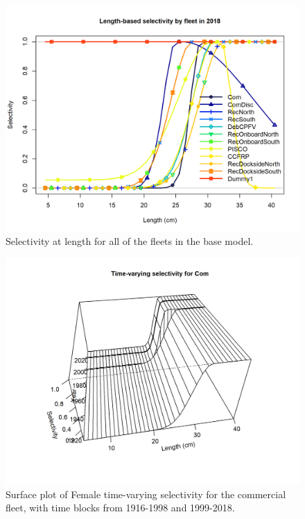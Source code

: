 \documentclass[12pt,]{article}
\begin{document}
\FloatBarrier

\FloatBarrier

\begin{figure}
\centering
\includegraphics{r4ss/plots_mod1/sel01_multiple_fleets_length1.png}
\caption{Selectivity at length for all of the fleets in the base model.
\label{fig:sel01_multiple_fleets_length1}}
\end{figure}

\begin{figure}
\centering
\includegraphics{r4ss/plots_mod1/sel03_len_timevary_surf_flt1sex1.png}
\caption{Surface plot of Female time-varying selectivity for the
commercial fleet, with time blocks from 1916-1998 and 1999-2018.
\label{fig:sel03_len_timevary_surf_flt1sex1}}
\end{figure}
\end{document}
